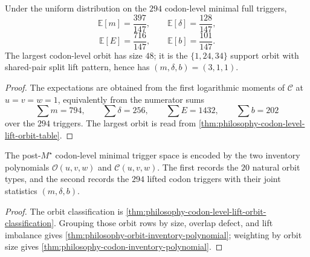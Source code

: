 \begin{corollary}
\label{cor:philosophy-orbit-inventory-means-largest-orbit}
Under the uniform distribution on the $294$ codon-level minimal full
triggers,
$$
  \mathbb{E}[m]=\frac{397}{147},
  \qquad
  \mathbb{E}[\delta]=\frac{128}{147},
$$
$$
  \mathbb{E}[E]=\frac{716}{147},
  \qquad
  \mathbb{E}[b]=\frac{101}{147}.
$$
The largest codon-level orbit has size $48$; it is the
$\{1,24,34\}$ support orbit with shared-pair split lift pattern, hence
has $(m,\delta,b)=(3,1,1)$.
\end{corollary}
\begin{proof}
The expectations are obtained from the first logarithmic moments of
$\mathcal{C}$ at $u=v=w=1$, equivalently from the numerator sums
$$
  \sum m=794,\qquad
  \sum\delta=256,\qquad
  \sum E=1432,\qquad
  \sum b=202
$$
over the $294$ triggers. The largest orbit is read from
\autoref{thm:philosophy-codon-level-lift-orbit-table}.
\end{proof}

\begin{theorem}
\label{thm:philosophy-orbit-inventory-polynomial-theorem}
The post-$M^{\star}$ codon-level minimal trigger space is encoded by the
two inventory polynomials $\mathcal{O}(u,v,w)$ and
$\mathcal{C}(u,v,w)$. The first records the $20$ natural orbit types, and
the second records the $294$ lifted codon triggers with their joint
statistics $(m,\delta,b)$.
\end{theorem}
\begin{proof}
The orbit classification is
\autoref{thm:philosophy-codon-level-lift-orbit-classification}. Grouping
those orbit rows by size, overlap defect, and lift imbalance gives
\autoref{thm:philosophy-orbit-inventory-polynomial}; weighting by orbit
size gives \autoref{thm:philosophy-codon-inventory-polynomial}.
\end{proof}

